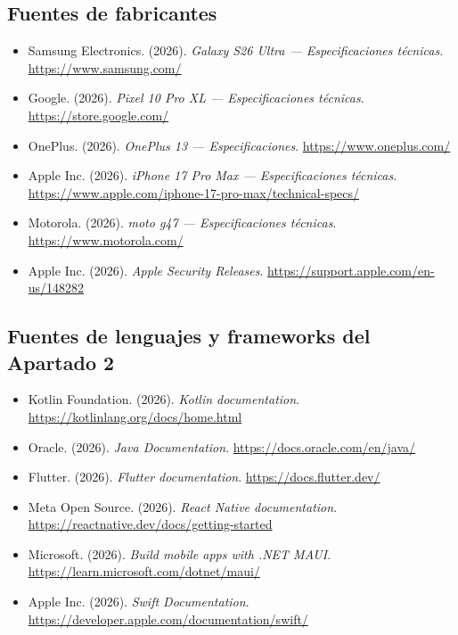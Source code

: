 \documentclass[11pt,a4paper]{article}
\begin{document}
	\subsection*{Fuentes de fabricantes}
	{\small
		\begin{itemize}[leftmargin=*,itemsep=0.1em,label={}]
			\item Samsung Electronics. (2026). \emph{Galaxy S26 Ultra --- Especificaciones técnicas}. \url{https://www.samsung.com/}
			\item Google. (2026). \emph{Pixel 10 Pro XL --- Especificaciones técnicas}. \url{https://store.google.com/}
			\item OnePlus. (2026). \emph{OnePlus 13 --- Especificaciones}. \url{https://www.oneplus.com/}
			\item Apple Inc. (2026). \emph{iPhone 17 Pro Max --- Especificaciones técnicas}. \url{https://www.apple.com/iphone-17-pro-max/technical-specs/}
			\item Motorola. (2026). \emph{moto g47 --- Especificaciones técnicas}. \url{https://www.motorola.com/}
			\item Apple Inc. (2026). \emph{Apple Security Releases}. \url{https://support.apple.com/en-us/148282}
		\end{itemize}
	}
	
	\subsection*{Fuentes de lenguajes y frameworks del Apartado 2}
	{\small
		\begin{itemize}[leftmargin=*,itemsep=0.1em,label={}]
			\item Kotlin Foundation. (2026). \emph{Kotlin documentation}. \url{https://kotlinlang.org/docs/home.html}
			\item Oracle. (2026). \emph{Java Documentation}. \url{https://docs.oracle.com/en/java/}
			\item Flutter. (2026). \emph{Flutter documentation}. \url{https://docs.flutter.dev/}
			\item Meta Open Source. (2026). \emph{React Native documentation}. \url{https://reactnative.dev/docs/getting-started}
			\item Microsoft. (2026). \emph{Build mobile apps with .NET MAUI}. \url{https://learn.microsoft.com/dotnet/maui/}
			\item Apple Inc. (2026). \emph{Swift Documentation}. \url{https://developer.apple.com/documentation/swift/}
		\end{itemize}
	}
	
\end{document}
